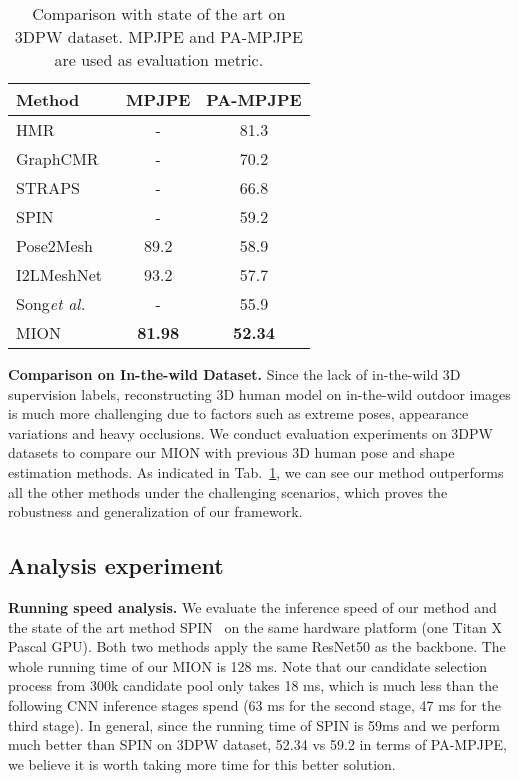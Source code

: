 \documentclass[sigconf]{acmart}
\begin{document}
\begin{table}[t]
	\centering
	
	\begin{tabular}{lcc}
		\toprule
		Method   & MPJPE & PA-MPJPE \\
		\midrule
		HMR~\cite{kanazawa2018end}   & - & 81.3  \\
		GraphCMR~\cite{kolotouros2019convolutional}   & - & 70.2 \\
		STRAPS~\cite{sengupta2020synthetic}   & - & 66.8 \\
		SPIN~\cite{kolotouros2019learning}   & - & 59.2  \\
		Pose2Mesh~\cite{choi2020pose2mesh}   & 89.2 & 58.9  \\
		I2LMeshNet~\cite{moon2020i2l} & 93.2 & 57.7  \\
		Song\textit{et al.}~\cite{song2020human} & - & 55.9  \\
\midrule
		MION & \textbf{81.98} & \textbf{52.34} \\
		\bottomrule
	\end{tabular}
	\vspace{1em}
	\caption{Comparison with state of the art on 3DPW dataset. MPJPE and PA-MPJPE are used as evaluation metric.}
	\label{table_compare-3dpw}
\end{table}



\textbf{Comparison on In-the-wild Dataset.}
Since the lack of in-the-wild 3D supervision labels, 
reconstructing 3D human model on in-the-wild outdoor images is much more challenging due
to factors such as extreme poses, appearance variations and heavy occlusions. We conduct evaluation experiments 
on 3DPW datasets to compare our MION with previous 3D human pose and shape estimation methods. As indicated in 
Tab.~\ref{table_compare-3dpw}, 
we can see our method outperforms all the other methods under the 
challenging scenarios, which proves the robustness and generalization of our framework. 



\subsection{Analysis experiment}


\textbf{Running speed analysis. }  We evaluate the inference speed of our method and the state of the art 
method SPIN~\cite{kolotouros2019learning} on the same hardware platform (one Titan X Pascal GPU). Both two methods apply the same ResNet50 as the backbone. The whole running time of our MION is 128 ms. Note that our candidate selection process from 300k candidate pool only takes 
18 ms, which is much less than the following CNN inference stages spend (63 ms for the second stage, 47 ms for the third stage). 
In general, since the running time of SPIN is 59ms and we perform much better than SPIN on 3DPW dataset, 52.34 vs 59.2 in 
terms of PA-MPJPE, we believe it is worth taking more time for this better solution. 
\end{document}
